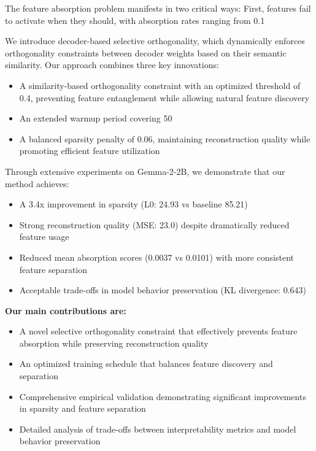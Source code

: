 \documentclass{article} %
\begin{document}
The feature absorption problem manifests in two critical ways: First, features fail to activate when they should, with absorption rates ranging from 0.1%

We introduce decoder-based selective orthogonality, which dynamically enforces orthogonality constraints between decoder weights based on their semantic similarity. Our approach combines three key innovations:
\begin{itemize}
    \item A similarity-based orthogonality constraint with an optimized threshold of 0.4, preventing feature entanglement while allowing natural feature discovery
    \item An extended warmup period covering 50%
    \item A balanced sparsity penalty of 0.06, maintaining reconstruction quality while promoting efficient feature utilization
\end{itemize}

Through extensive experiments on Gemma-2-2B, we demonstrate that our method achieves:
\begin{itemize}
    \item A 3.4x improvement in sparsity (L0: 24.93 vs baseline 85.21)
    \item Strong reconstruction quality (MSE: 23.0) despite dramatically reduced feature usage
    \item Reduced mean absorption scores (0.0037 vs 0.0101) with more consistent feature separation
    \item Acceptable trade-offs in model behavior preservation (KL divergence: 0.643)
\end{itemize}

\noindent\textbf{Our main contributions are:}
\begin{itemize}
    \item A novel selective orthogonality constraint that effectively prevents feature absorption while preserving reconstruction quality
    \item An optimized training schedule that balances feature discovery and separation
    \item Comprehensive empirical validation demonstrating significant improvements in sparsity and feature separation
    \item Detailed analysis of trade-offs between interpretability metrics and model behavior preservation
\end{itemize}
\end{document}
